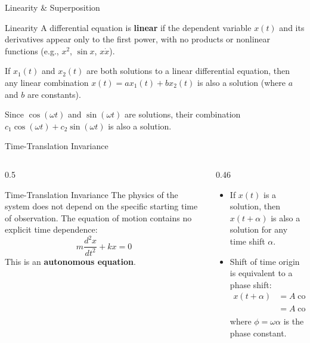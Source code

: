 \documentclass[aspectratio=169,xcolor=dvipsnames]{beamer}
\begin{document}
\begin{frame}{Linearity \& Superposition}
  \begin{umdefinition}{Linearity}
    A differential equation is \textbf{linear} if the dependent variable $x(t)$ and its derivatives appear only to the first power, with no products or nonlinear functions (e.g., $x^2$, $\sin x$, $x \dot{x}$).
  \end{umdefinition}
  \pause
  \vspace{0.4em}
  \begin{umnote}
    If $x_1(t)$ and $x_2(t)$ are both solutions to a linear differential equation, then any linear combination $x(t) = a x_1(t) + b x_2(t)$ is also a solution (where $a$ and $b$ are constants).
  \end{umnote}
  \pause
  \vspace{0.4em}
  Since $\cos(\omega t)$ and $\sin(\omega t)$ are solutions, their combination $c_1\cos(\omega t) + c_2\sin(\omega t)$ is also a solution.
\end{frame}

\begin{frame}{Time-Translation Invariance}
  \begin{columns}[T]
    \begin{column}{0.5\textwidth}
      \begin{umlaw}{Time-Translation Invariance}
        The physics of the system does not depend on the specific starting time of observation. The equation of motion contains no explicit time dependence:
        \[
          m\frac{d^2x}{dt^2} + kx = 0
        \]
        This is an \textbf{autonomous equation}.
      \end{umlaw}
    \end{column}
    \hfill
    \begin{column}{0.46\textwidth}
      \begin{itemize}
        \item If $x(t)$ is a solution, then $x(t+\alpha)$ is also a solution for any time shift $\alpha$.
        \item Shift of time origin is equivalent to a phase shift:
              \[
                \begin{aligned}
                  x(t+\alpha) &= A\cos(\omega(t+\alpha)) \\
                              &= A\cos(\omega t + \phi)
                \end{aligned}
              \]
              where $\phi = \omega\alpha$ is the phase constant.
      \end{itemize}
    \end{column}
  \end{columns}
\end{frame}
\end{document}
